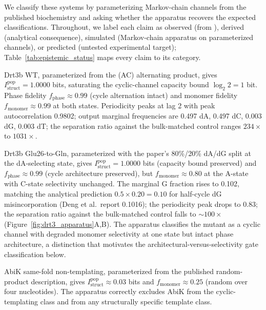 \documentclass[aps,prx,reprint,amsmath,amssymb,floatfix,superscriptaddress,nofootinbib]{revtex4-2}
\theoremstyle{plain-thm}
\theoremstyle{definition-thm}
\newcommand{\Istructpop}{I_{\mathrm{struct}}^{\mathrm{pop}}}
\newcommand{\fphase}{f_{\mathrm{phase}}}
\newcommand{\fmonomer}{f_{\mathrm{monomer}}}
\begin{document}
We classify these systems by parameterizing Markov-chain channels from the published biochemistry and asking whether the apparatus recovers the expected classifications. Throughout, we label each claim as observed (from \citet{Deng2026}), derived (analytical consequence), simulated (Markov-chain apparatus on parameterized channels), or predicted (untested experimental target); Table~\ref{tab:epistemic_status} maps every claim to its category.

Drt3b WT, parameterized from the (AC) alternating product, gives $\Istructpop = 1.0000$ bits, saturating the cyclic-channel capacity bound $\log_2 2 = 1$ bit. Phase fidelity $\fphase \approx 0.99$ (cycle alternation intact) and monomer fidelity $\fmonomer \approx 0.99$ at both states. Periodicity peaks at lag 2 with peak autocorrelation 0.9802; output marginal frequencies are 0.497 dA, 0.497 dC, 0.003 dG, 0.003 dT; the separation ratio against the bulk-matched control ranges $234\times$ to $1031\times$.

Drt3b Glu26-to-Gln, parameterized with the paper's 80\%/20\% dA/dG split at the dA-selecting state, gives $\Istructpop = 1.0000$ bits (capacity bound preserved) and $\fphase \approx 0.99$ (cycle architecture preserved), but $\fmonomer \approx 0.80$ at the A-state with C-state selectivity unchanged. The marginal G fraction rises to 0.102, matching the analytical prediction $0.5 \times 0.20 = 0.10$ for half-cycle dG misincorporation (Deng et al.\ report 0.1016); the periodicity peak drops to 0.83; the separation ratio against the bulk-matched control falls to $\sim 100\times$ (Figure~\ref{fig:drt3_apparatus}A,B). The apparatus classifies the mutant as a cyclic channel with degraded monomer selectivity at one state but intact phase architecture, a distinction that motivates the architectural-versus-selectivity gate classification below.

AbiK same-fold non-templating, parameterized from the published random-product description, gives $\Istructpop \approx 0.03$ bits and $\fmonomer \approx 0.25$ (random over four nucleotides). The apparatus correctly excludes AbiK from the cyclic-templating class and from any structurally specific template class.
\end{document}
